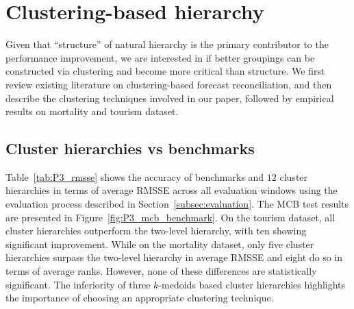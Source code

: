 \documentclass[a4paper,review,12pt,authoryear]{elsarticle}
\begin{document}
\section{Clustering-based hierarchy}
\label{sec:clustering}

Given that ``structure'' of natural hierarchy is the primary contributor to the performance improvement, we are interested in if better groupings can be constructed via clustering and become more critical than structure. 
We first review existing literature on clustering-based forecast reconciliation, and then describe the clustering techniques involved in our paper, followed by empirical results on mortality and tourism dataset.

\subsection{Cluster hierarchies vs benchmarks}
\label{subsec:P3_benchmark}
Table~\ref{tab:P3_rmsse} shows the accuracy of benchmarks and $12$ cluster hierarchies in terms of average RMSSE across all evaluation windows using the evaluation process described in Section~\ref{subsec:evaluation}.  
The MCB test results are presented in Figure~\ref{fig:P3_mcb_benchmark}.
On the tourism dataset, all cluster hierarchies outperform the two-level hierarchy, with ten showing significant improvement.
While on the mortality dataset, only five cluster hierarchies surpass the two-level hierarchy in average RMSSE and eight do so in terms of average ranks. 
However, none of these differences are statistically significant. 
The inferiority of three $k$-medoids based cluster hierarchies highlights the importance of choosing an appropriate clustering technique.
\end{document}
